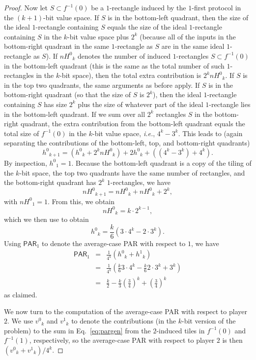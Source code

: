 \documentclass{article}
\theoremstyle{theorem}
\theoremstyle{definition}
\theoremstyle{remark}
\newcommand{\ie}{\emph{i.e.}}
\newcommand{\PAR}{\ensuremath{\mathsf{PAR}}}
\newcommand{\svn}{\ensuremath{v^0}}
\newcommand{\svy}{\ensuremath{v^1}}
\newcommand{\shn}{\ensuremath{h^0}}
\newcommand{\shy}{\ensuremath{h^1}}
\newcommand{\nh}{\ensuremath{nH^0}}
\begin{document}
\begin{proof}
Now let $S\subset f^{-1}(0)$ be a $1$-rectangle induced by the $1$-first protocol in the $(k+1)$-bit value space.  If $S$ is in the bottom-left quadrant, then the size of the ideal $1$-rectangle containing $S$ equals the size of the ideal $1$-rectangle containing $S$ in the $k$-bit value space plus $2^k$ (because all of the inputs in the bottom-right quadrant in the same $1$-rectangle as $S$ are in the same ideal $1$-rectangle as $S$).  If $\nh_k$ denotes the number of induced $1$-rectangles $S\subset f^{-1}(0)$ in the bottom-left quadrant (this is the same as the total number of such $1$-rectangles in the $k$-bit space), then the total extra contribution is $2^k\nh_k$.  If $S$ is in the top two quadrants, the same arguments as before apply.  If $S$ is in the bottom-right quadrant (so that the size of $S$ is $2^k$), then the ideal $1$-rectangle containing $S$ has size $2^k$ plus the size of whatever part of the ideal $1$-rectangle lies in the bottom-left quadrant.  If we sum over all $2^k$ rectangles $S$ in the bottom-right quadrant, the extra contribution from the bottom-left quadrant equals the total size of $f^{-1}(0)$ in the $k$-bit value space, \ie, $4^k-3^k$.  This leads to (again separating the contributions of the bottom-left, top, and bottom-right quadrants)
\[
\shn_{k+1} = (\shn_k + 2^k\nh_k) + 2\shn_k + ((4^k-3^k)+4^k).
\]
By inspection, $\shn_1 = 1$.  Because the bottom-left quadrant is a copy of the tiling of the $k$-bit space, the top two quadrants have the same number of rectangles, and the bottom-right quadrant has $2^k$ $1$-rectangles, we have
\[
\nh_{k+1} = \nh_k + \nh_k + 2^k,
\]
with $\nh_1 = 1$.  From this, we obtain
\[
\nh_k = k\cdot 2^{k-1},
\]
which we then use to obtain
\[
\shn_k = \frac{k}{6}\left(3\cdot 4^k - 2\cdot 3^k\right).
\]
Using $\PAR_1$ to denote the average-case PAR with respect to $1$, we have
\begin{eqnarray*}
\PAR_1 &=& \frac{1}{4^k}(\shn_k + \shy_k)\\
    &=& \frac{1}{4^k}\left(\frac{k}{6}3\cdot 4^k - \frac{k}{6}2\cdot 3^k + 3^k\right)\\
    &=& \frac{k}{2} - \frac{k}{3}\left(\frac{3}{4}\right)^k + \left(\frac{3}{4}\right)^k
\end{eqnarray*}
as claimed.

We now turn to the computation of the average-case PAR with respect to player $2$.  We use $\svn_k$ and $\svy_k$ to denote the contributions (in the $k$-bit version of the problem) to the sum in Eq.~\ref{eq:pargen} from the $2$-induced tiles in $f^{-1}(0)$ and $f^{-1}(1)$, respectively, so the average-case PAR with respect to player $2$ is then $\left(\svn_k+\svy_k\right)/4^k$.


\end{proof}
\end{document}
